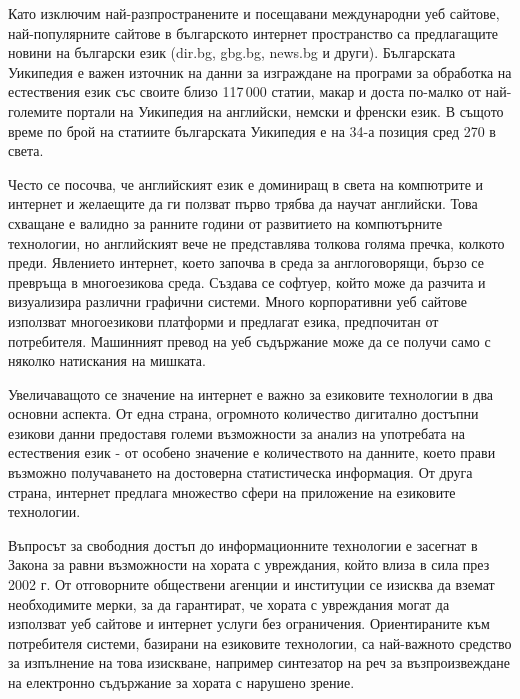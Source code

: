 \documentclass[]{../../metanetpaper}
\begin{document}
\begin{multicols}{2}
Като изключим най-разпространените и посещавани международни уеб сайтове, най-популярните сайтове в българското интернет пространство са предлагащите новини на български език (dir.bg, gbg.bg, news.bg и други). Българската Уикипедия е важен източник на данни за изграждане на програми за обработка на естествения език със своите близо 117\,000 статии, макар и доста по-малко от най-големите портали на Уикипедия на английски, немски и френски език. В същото време по брой на статиите българската Уикипедия е на 34-а \cite{metadata} позиция сред 270 в света. 

Често се посочва, че английският език е доминиращ в света на компютрите и интернет и желаещите да ги ползват първо трябва да научат английски. Това схващане е валидно  за ранните години от развитието на компютърните технологии, но английският вече не представлява толкова голяма пречка, колкото преди. Явлението интернет, което започва в среда за англоговорящи, бързо се превръща в многоезикова среда. Създава се софтуер, който може да разчита и визуализира различни графични системи. Много корпоративни уеб сайтове използват многоезикови платформи и предлагат езика, предпочитан от потребителя. Машинният превод на уеб съдържание може да се получи само с няколко натискания на мишката.


Увеличаващото се значение на интернет е важно за езиковите технологии в два основни аспекта. От една страна, огромното количество дигитално достъпни езикови данни предоставя големи възможности за анализ на употребата на естествения език - от особено значение е количеството на данните, което прави възможно получаването на достоверна статистическа информация. От друга страна, интернет предлага множество сфери на приложение на езиковите технологии. 

Въпросът за свободния достъп до информационните технологии е засегнат в Закона за равни възможности на хората с увреждания, който влиза в сила през 2002 г. От отговорните обществени агенции и институции се изисква да вземат необходимите мерки, за да гарантират, че хората с увреждания могат да използват уеб сайтове и интернет услуги без ограничения. Ориентираните към потребителя системи, базирани на езиковите технологии, са най-важното средство за изпълнение на това изискване, например синтезатор на реч за възпроизвеждане  на електронно съдържание за хората с нарушено зрение.


\end{multicols}
\end{document}

